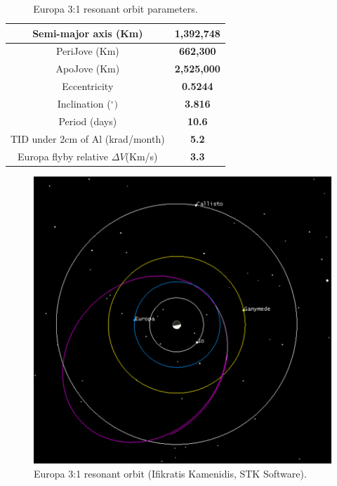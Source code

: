 \begin{table}[htb!]
  \centering
    \begin{tabular}{|c|c|}
    \hline
    Semi-major axis (Km) & \textbf{1,392,748} \bigstrut\\
    \hline
    PeriJove (Km) & \textbf{662,300} \bigstrut\\
    \hline
    ApoJove (Km) & \textbf{2,525,000} \bigstrut\\
    \hline
    Eccentricity & \textbf{0.5244} \bigstrut\\
    \hline
    Inclination ($^\circ)$ & \textbf{3.816} \bigstrut\\
    \hline
    Period (days) & \textbf{10.6} \bigstrut\\
    \hline
    TID under 2cm of Al (krad/month) & \textbf{5.2} \bigstrut\\
    \hline
    Europa flyby relative $\Delta V$(Km/s) & \textbf{3.3} \bigstrut\\
    \hline
    \end{tabular}%
    \caption{Europa 3:1 resonant orbit parameters.}
  \label{tab:eurorb}%
\end{table}%
\begin{figure}[htb!]
\centering
\includegraphics[scale=1]{figures/Orbiter/europares.png}
\caption{Europa 3:1 resonant orbit (Ifikratis Kamenidis, STK Software).}
\end{figure}
